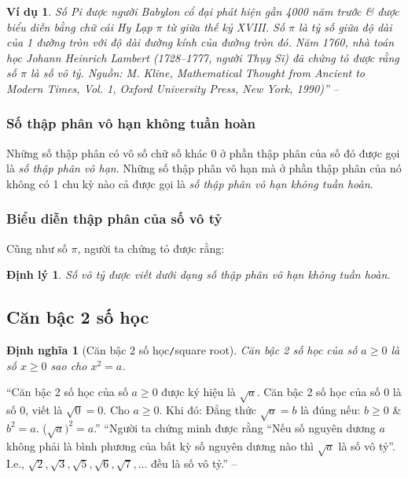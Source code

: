 \documentclass[oneside]{book}
\numberwithin{equation}{section}
\newtheorem{dinhnghia}{Định nghĩa}[section]
\newtheorem{vidu}{Ví dụ}[section]
\newtheorem{dinhly}{Định lý}[section]
\begin{document}
\begin{vidu}
	Số Pi được người Babylon cổ đại phát hiện gần 4000 năm trước \& được biểu diễn bằng chữ cái Hy Lạp $\pi$ từ giữa thế kỷ XVIII. Số $\pi$ là tỷ số giữa độ dài của 1 đường tròn với độ dài đường kính của đường tròn đó. Năm 1760, nhà toán học Johann Heinrich Lambert (1728--1777, người Thụy Sĩ) đã chứng tỏ được rằng số $\pi$ là số vô tỷ. Nguồn: M. Kline, \textit{Mathematical Thought from Ancient to Modern Times}, Vol. 1, Oxford University Press, New York, 1990)'' -- \cite[p. 32]{SGK_Toan_7_Canh_Dieu_tap_1}
\end{vidu}

\subsubsection{Số thập phân vô hạn không tuần hoàn}
Những số thập phân có vô số chữ số khác $0$ ở phần thập phân của số đó được gọi là \textit{số thập phân vô hạn}. Những số thập phân vô hạn mà ở phần thập phân của nó không có 1 chu kỳ nào cả được gọi là \textit{số thập phân vô hạn không tuần hoàn}.

\subsubsection{Biểu diễn thập phân của số vô tỷ}
Cũng như số $\pi$, người ta chứng tỏ được rằng:

\begin{dinhly}
	Số vô tỷ được viết dưới dạng số thập phân vô hạn không tuần hoàn.
\end{dinhly}

\subsection{Căn bậc 2 số học}

\begin{dinhnghia}[Căn bậc 2 số học\texttt{/}square root]
	\emph{Căn bậc 2 số học} của số $a\ge 0$ là số $x\ge 0$ sao cho $x^2 = a$.
\end{dinhnghia}
``Căn bậc 2 số học của số $a\ge 0$ được ký hiệu là $\sqrt{a}$. Căn bậc 2 số học của số $0$ là số $0$, viết là $\sqrt{0} = 0$. Cho $a\ge 0$. Khi đó: Đẳng thức $\sqrt{a} = b$ là đúng nếu: $b\ge 0$ \& $b^2 = a$. ($\sqrt{a})^2 = a$.'' ``Người ta chứng minh được rằng ``Nếu số nguyên dương $a$ không phải là bình phương của bất kỳ số nguyên dương nào thì $\sqrt{a}$ là số vô tỷ''. I.e., $\sqrt{2},\sqrt{3},\sqrt{5},\sqrt{6},\sqrt{7},\ldots$ đều là số vô tỷ.'' -- \cite[p. 34]{SGK_Toan_7_Canh_Dieu_tap_1}
\end{document}

